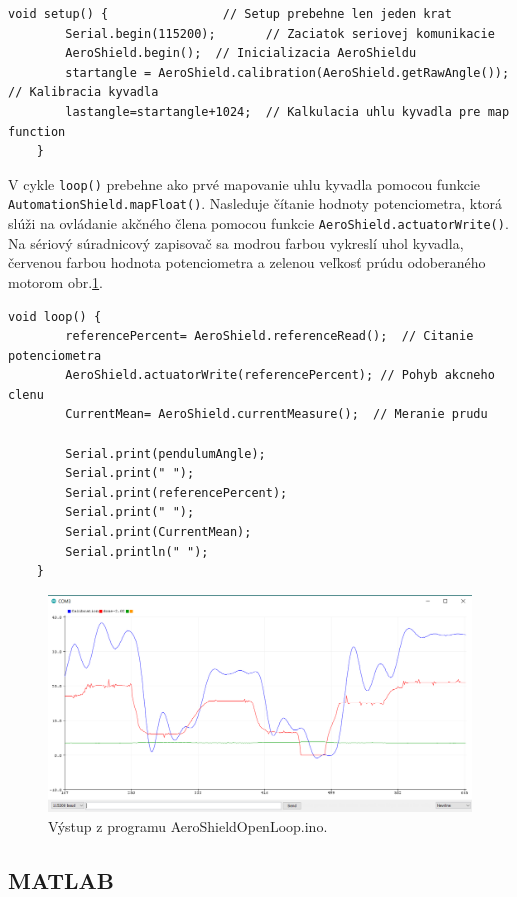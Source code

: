 \begin{lstlisting}[caption={AeroShield open loop setup().},captionpos=b]
	void setup() {                // Setup prebehne len jeden krat 
		Serial.begin(115200);       // Zaciatok seriovej komunikacie 
		AeroShield.begin();  // Inicializacia AeroShieldu 
		startangle = AeroShield.calibration(AeroShield.getRawAngle());   // Kalibracia kyvadla
		lastangle=startangle+1024;  // Kalkulacia uhlu kyvadla pre map function
	}
\end{lstlisting}

V cykle \verb|loop()| prebehne ako prvé mapovanie uhlu kyvadla pomocou funkcie \verb|AutomationShield.mapFloat()|. Nasleduje čítanie hodnoty potenciometra, ktorá slúži na ovládanie akčného člena pomocou funkcie \verb|AeroShield.actuatorWrite()|. Na sériový súradnicový zapisovač sa modrou farbou vykreslí uhol kyvadla, červenou farbou hodnota potenciometra a zelenou veľkosť prúdu odoberaného motorom obr.\ref{OBRAZOK 3.1}. 

\begin{lstlisting}[caption={AeroShield open loop loop().},captionpos=b]
	void loop() {
		referencePercent= AeroShield.referenceRead();  // Citanie potenciometra
		AeroShield.actuatorWrite(referencePercent); // Pohyb akcneho clenu
		CurrentMean= AeroShield.currentMeasure();  // Meranie prudu
		
		Serial.print(pendulumAngle);    
		Serial.print(" ");
		Serial.print(referencePercent);  
		Serial.print(" ");
		Serial.print(CurrentMean);   
		Serial.println(" ");
	}
\end{lstlisting}

\begin{figure}[!tbh]
	\centering
	\includegraphics[width=120mm]{obr/VystupOLIDE.png}
	\caption{Výstup z programu AeroShieldOpenLoop.ino.}\label{OBRAZOK 3.1}
\end{figure}

\subsection{MATLAB}
\label{MatlabPID}

